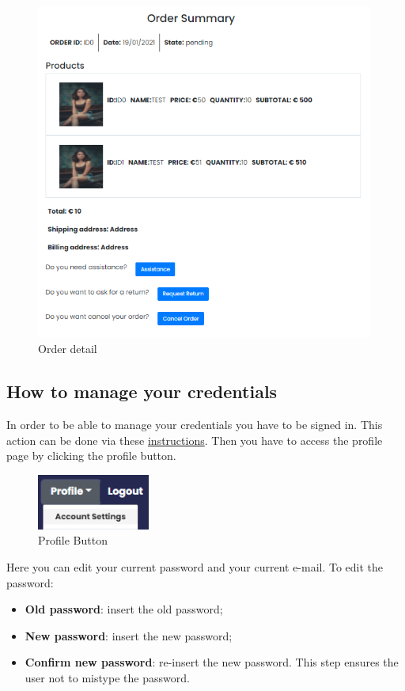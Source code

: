\begin{figure}[H]
    \centering
    \includegraphics[width=30em]{res/images/cliente/order.png}
    \caption{Order detail}
\end{figure}

\subsection{How to manage your credentials} \label{_credentials}
In order to be able to manage your credentials you have to be signed in. This action can be done via these \hyperref[_signin]{instructions}.
Then you have to access the profile page by clicking the profile button.
\begin{figure}[H]
    \centering
    \includegraphics[width=10em]{res/images/cliente/profileaccount.png}
    \caption{Profile Button}
\end{figure}

Here you can edit your current password and your current e-mail.
To edit the password:
\begin{itemize} 
    \item \textbf{Old password}: insert the old password;
    \item \textbf{New password}: insert the new password; 
    \item \textbf{Confirm new password}: re-insert the new password. This step ensures the user not to  mistype the password.
\end{itemize}


